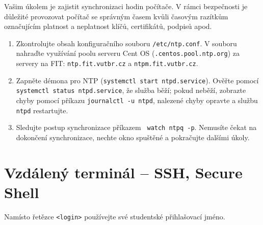 \documentclass[a4paper,11pt]{article}
\begin{document}
Vašim úkolem je zajistit synchronizaci hodin počítače. V rámci bezpečnosti je
důležité provozovat počítač se správným časem kvůli časovým razítkům
označujícím platnost a neplatnost klíčů, certifikátů, podpisů apod.

\begin{enumerate}

  \item Zkontrolujte obsah konfiguračního souboru {\tt /etc/ntp.conf}. V souboru
    nahraďte využívání poolu serveru Cent OS ({\tt *.centos.pool.ntp.org}) za
    servery na FIT: {\tt ntp.fit.vutbr.cz} a {\tt ntpm.fit.vutbr.cz}.

  \item Zapněte démona pro NTP ({\tt systemctl start ntpd.service}).
    Ověřte pomocí {\tt systemctl status ntpd.service}, že služba běží; pokud
    neběží, zobrazte chyby pomocí příkazu {\tt journalctl -u ntpd}, nalezené
    chyby opravte a službu {\tt ntpd} restartujte.

  \item Sledujte postup synchronizace příkazem {\tt
    watch ntpq -p}. Nemusíte čekat na dokončení synchronizace, nechte okno
    spuštěné a pokračujte dalšími úkoly.

\end{enumerate}

\section{Vzdálený terminál -- SSH, Secure Shell}

Namísto řetězce {\tt <login>} používejte své studentské přihlašovací jméno.
\end{document}
